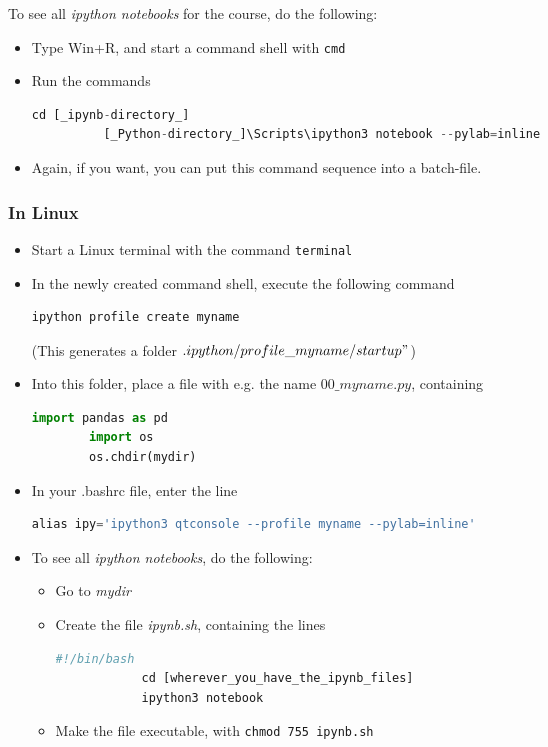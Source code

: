 To see all \emph{ipython notebooks} for the course, do the following:
\begin{itemize}
    \item Type Win+R, and start a command shell with \lstinline{cmd}
    \item Run the commands
        \begin{lstlisting}[language=Python]
          cd [_ipynb-directory_]
          [_Python-directory_]\Scripts\ipython3 notebook --pylab=inline
        \end{lstlisting}
    \item Again, if you want, you can put this command sequence into a batch-file.
\end{itemize}


\subsubsection{In Linux}

\begin{itemize}
  \item Start a Linux terminal with the command \lstinline{terminal}

  \item In the newly created command shell, execute the following command
        \begin{lstlisting}[language=Python]
            ipython profile create myname
        \end{lstlisting}
        (This generates a folder $.ipython/profile\_myname/startup"$)
  \item Into this folder, place a file with e.g. the name $00\_myname.py$, containing
        \begin{lstlisting}[language=Python]
        import pandas as pd
        import os
        os.chdir(mydir)
        \end{lstlisting}
  \item In your .bashrc file, enter the line
      \begin{lstlisting}[language=Python]
          alias ipy='ipython3 qtconsole --profile myname --pylab=inline'
      \end{lstlisting}
  \item To see all \emph{ipython notebooks}, do the following:
    \begin{itemize}
      \item Go to \emph{mydir}
      \item Create the file \emph{ipynb.sh}, containing the lines
        \begin{lstlisting}[language=Python]
            #!/bin/bash
            cd [wherever_you_have_the_ipynb_files]
            ipython3 notebook
        \end{lstlisting}
      \item Make the file executable, with \lstinline{chmod 755 ipynb.sh}
    \end{itemize}
\end{itemize}

